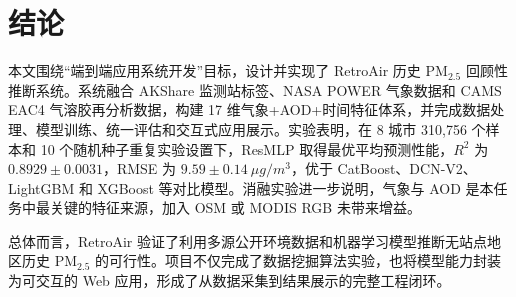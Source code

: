 ﻿\documentclass[UTF8,zihao=-4,a4paper]{ctexart}
\newcommand{\pmfine}{PM$_{2.5}$}
\newcommand{\aod}{AOD}
\begin{document}
\section{结论}

本文围绕“端到端应用系统开发”目标，设计并实现了 RetroAir 历史 \pmfine{} 回顾性推断系统。系统融合 AKShare 监测站标签、NASA POWER 气象数据和 CAMS EAC4 气溶胶再分析数据，构建 17 维气象+\aod{}+时间特征体系，并完成数据处理、模型训练、统一评估和交互式应用展示。实验表明，在 8 城市 310,756 个样本和 10 个随机种子重复实验设置下，ResMLP 取得最优平均预测性能，$R^2$ 为 $0.8929\pm0.0031$，RMSE 为 $9.59\pm0.14\ \mu g/m^3$，优于 CatBoost、DCN-V2、LightGBM 和 XGBoost 等对比模型。消融实验进一步说明，气象与 \aod{} 是本任务中最关键的特征来源，加入 OSM 或 MODIS RGB 未带来增益。

总体而言，RetroAir 验证了利用多源公开环境数据和机器学习模型推断无站点地区历史 \pmfine{} 的可行性。项目不仅完成了数据挖掘算法实验，也将模型能力封装为可交互的 Web 应用，形成了从数据采集到结果展示的完整工程闭环。
\end{document}
